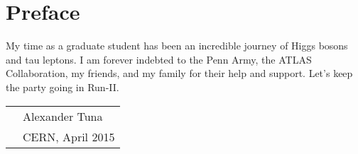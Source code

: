 
\chapter*{Preface}

My time as a graduate student has been an incredible journey of Higgs bosons and tau leptons. I am forever indebted to the Penn Army, the ATLAS Collaboration, my friends, and my family for their help and support. Let's keep the party going in Run-II.

\vspace{0.05\textheight}

\begin{tabular}{p{} l}
  & Alexander Tuna   \\
  & CERN, April 2015 \\
\end{tabular}

